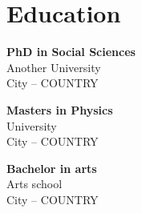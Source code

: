 \documentclass[a4paper,10pt]{article}
\begin{document}
\begin{adjustbox}{valign=t}
\begin{minipage}{0.3\textwidth}
\vfill

\section*{Education}
	\begin{description}
	\raggedright
	\item [\normalfont \textcolor{ColorOne}{2021.}] \textbf{PhD in
Social Sciences}\\
	Another University\\
	City -- COUNTRY

	\item [\normalfont \textcolor{ColorOne}{2015.}] \textbf{Masters in
	Physics}\\
	University\\
	City -- COUNTRY

	\item [\normalfont \textcolor{ColorOne}{2013.}] \textbf{Bachelor in arts}\\ 
	Arts school \\
	City -- COUNTRY
\end{description}

\vfill
\end{minipage}
\end{adjustbox}
%
%
%
\hfill
\begin{adjustbox}{valign=t}
\begin{minipage}{0.05\textwidth} %
\MyVerticalRule  %
\end{minipage}
\end{adjustbox}
\hfill
%
\end{document}
